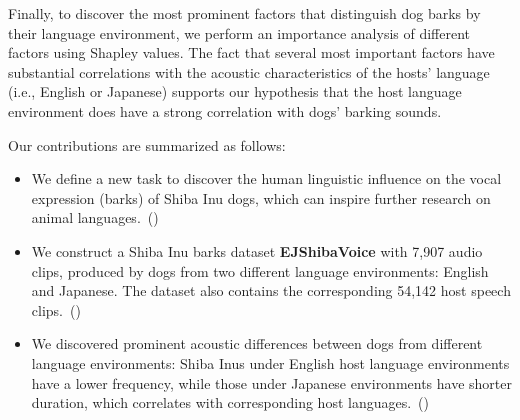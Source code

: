 

Finally, to discover the most prominent factors that distinguish dog barks by their language environment, 
we perform an importance analysis of different factors using Shapley values. The fact that several most important factors have substantial correlations with the acoustic characteristics of the hosts' language (i.e., English or Japanese) supports our hypothesis that the host language environment does have a strong correlation with dogs' barking sounds.

Our contributions are summarized as follows:

\begin{itemize}
	\item We define a new task to discover the human linguistic influence on the vocal expression
	(barks) of Shiba Inu dogs, which can inspire further research on animal languages.~()
	\item We construct a Shiba Inu barks dataset \textbf{EJShibaVoice} with 7,907 audio clips, 
	produced by dogs from two different language environments: English and Japanese. The dataset also contains the corresponding 54,142 host speech clips.~()
	\item We discovered prominent acoustic differences between dogs from different language environments: 
	Shiba Inus under English host language environments have a lower frequency, while those under Japanese environments have shorter duration, which correlates with 
	corresponding host languages.~()%
\end{itemize}